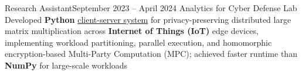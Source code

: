 
\subheading
    {Research Assistant}{September 2023 -- April 2024}
    {Analytics for Cyber Defense Lab}{}
    \itemListStart
        \listItem{}
            {Developed \textbf{Python} \href{https://github.com/lericemautech/Q-SECURE}{client-server system} for privacy-preserving distributed large matrix multiplication across \textbf{Internet of Things (IoT)} edge devices, implementing workload partitioning, parallel execution, and homomorphic encryption-based Multi-Party Computation (MPC); achieved faster runtime than \textbf{NumPy} for large-scale workloads} %
    \itemListEnd